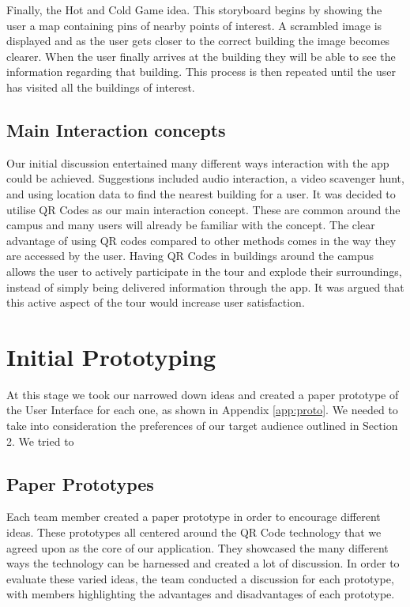 \documentclass[a4,10pt,twocolumn]{article}
\begin{document}
Finally, the Hot and Cold Game idea. This storyboard begins by showing the user a map containing pins of nearby points of interest. A scrambled image is displayed and as the user gets closer to the correct building the image becomes clearer. When the user finally arrives at the building they will be able to see the information regarding that building. This process is then repeated until the user has visited all the buildings of interest.

\subsection{Main Interaction concepts}

Our initial discussion entertained many different ways interaction with the app could be achieved. Suggestions included audio interaction, a video scavenger hunt, and using location data to find the nearest building for a user. It was decided to utilise QR Codes as our main interaction concept. These are common around the campus and many users will already be familiar with the concept. The clear advantage of using QR codes compared to other methods comes in the way they are accessed by the user. Having QR Codes in buildings around the campus allows the user to actively participate in the tour and explode their surroundings, instead of simply being delivered information through the app. It was argued that this active aspect of the tour would increase user satisfaction.


\section{Initial Prototyping}

At this stage we took our narrowed down ideas and created a paper prototype of the User Interface for each one, as shown in Appendix \ref{app:proto}. We needed to take into consideration the preferences of our target audience outlined in Section 2. We tried to 

\subsection{Paper Prototypes}
Each team member created a paper prototype in order to encourage different ideas. These prototypes all centered around the QR Code technology that we agreed upon as the core of our application. They showcased the many different ways the technology can be harnessed and created a lot of discussion. In order to evaluate these varied ideas, the team conducted a discussion for each prototype, with members highlighting the advantages and disadvantages of each prototype.
\end{document}
